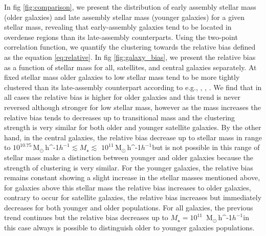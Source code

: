 \documentclass[fleqn,usenatbib]{mnras}
\newcommand{\Msunh}{\,{\rm M}$_{\odot}$\,\ifmmode h^{-1}\else $h^{-1}$\fi}
\begin{document}





In fig \ref{fig:comparison}, we present the distribution of early
assembly stellar mass (older galaxies) and late assembly stellar mass
(younger galaxies) for a given stellar mass, revealing that
early-assembly galaxies tend to be located in overdense regions than
its late-assembly counterparts.  
Using the two-point correlation function, we quantify the clustering
towards the relative bias defined as the equation
\ref{eq:relative}. In fig \ref{fig:galaxy_bias}, we present the
relative bias as a function of stellar mass for all, satellites, and
central galaxies separately. At fixed stellar mass older galaxies to
low stellar mass tend to be more tightly clustered than its
late-assembly counterpart according to e.g., \citep{Lacerna_2014},
\citep{2013MNRAS.433..515W}, \citep{2009MNRAS.394.2229Z}. We find that
in all cases the relative bias is higher for older galaxies and this
trend is never reversed although stronger for low stellar mass,
however as the mass increases the relative bias tends to decreases up
to transitional mass and the clustering strength is very similar for
both older and younger satellite galaxies. 
By the other hand, in the central galaxies, the relative bias decrease
up to stellar mass in range to $10^{10.75}$\Msunh $\lesssim M_\star
\lesssim$ $10^{11}$\Msunh but is not possible in this range of stellar
mass make a distinction between younger and older galaxies because the
strength of clustering is very similar.  
For the younger galaxies, the relative bias remains constant showing a
slight increase in the stellar masses mentioned above, for galaxies
above this stellar mass the relative bias increases to older galaxies,
contrary to occur for satellite galaxies, the relative bias increases
but immediately decreases for both younger and older populations. For
all galaxies, the previous trend continues but the relative bias
decreases up to $M_\star = 10^{11}$ \Msunh in this case always is
possible to distinguish older to younger galaxies populations. 
\end{document}
